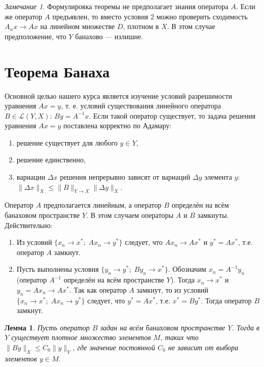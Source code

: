 \documentclass[12pt,a4paper,titlepage,oneside]{book}
\theoremstyle{definition}
\theoremstyle{plain}
\theoremstyle{break}
\theoremstyle{remark}
\newtheorem*{remark}{Замечание}
\theoremstyle{remark}
\theoremstyle{remark}
\theoremstyle{remark}
\theoremstyle{plain}
\newtheorem*{lemma}{Лемма}
\theoremstyle{plain}
\begin{document}
\begin{remark}
Формулировка теоремы не предполагает знания оператора $A$. Если же оператор $A$ предъявлен, то вместо условия 2 можно проверить сходимость $A_n x\to A x$ на линейном множестве $D$, плотном в $X$. В этом случае предположение, что $Y$ банахово --- излишне.
\end{remark}

\section{Теорема Банаха}
Основной целью нашего курса является изучение условий разрешимости уравнения $Ax=y$, т. е. условий существования $\underbar {линейного}$ оператора $B\in \mathcal{L}(Y, X)$: $By=A^{-1}x$. Если такой оператор существует, то задача решения уравнения $Ax=y$ поставлена корректно по Адамару:
\begin{enumerate}
	\item решение существует для любого $y \in Y$,
	\item решение единственно,
	\item вариации $\Delta x$ решения непрерывно зависят от вариаций $\Delta y$ элемента $y$: $\lVert \Delta x\rVert_X \leqslant \lVert B\rVert_{Y\to X}\lVert \Delta y\rVert_X$.
\end{enumerate}
Оператор $A$ предполагается линейным, а оператор $B$ определён на всём банаховом пространстве $Y$. В этом случаем операторы $A$ и $B$ замкнуты. Действительно:
\begin{enumerate}

	\item Из условий $\lbrace x_n \to x^{*}; \; Ax_n \to y^{*} \rbrace$ следует, что $Ax_n \to Ax^{*}$ и $y^{*}=Ax^{*}$, т.е. оператор $A$ замкнут.

	\item Пусть выполнены условия $\lbrace y_n \to y^{*}; \; By_n \to x^{*} \rbrace$. Обозначим $x_n=A^{-1}y_n$ (оператор $A^{-1}$ определён на всём пространстве $Y$). Тогда $x_n \to x^{*}$ и $y_n=Ax_n \to Ax^{*}$. Так как оператор $A$ замкнут, то из условий $\lbrace x_n \to x^{*}; \; Ax_n \to y^{*} \rbrace$ следует, что $y^{*}=Ax^{*}$, т.е. $x^{*}=By^{*}$. Тогда оператор $B$ замкнут.
	
\end{enumerate}
	
\begin{lemma}
Пусть оператор $B$ задан на всём $\underbar {банаховом}$ пространстве $Y$. Тогда в $Y$ существует плотное множество элементов $M$, таких что $\lVert By\rVert_X \leqslant C_0\lVert y\rVert_Y $, где значение постоянной $C_0$ не зависит от выбора элементов $y \in M$.
\end{lemma}
\end{document}
